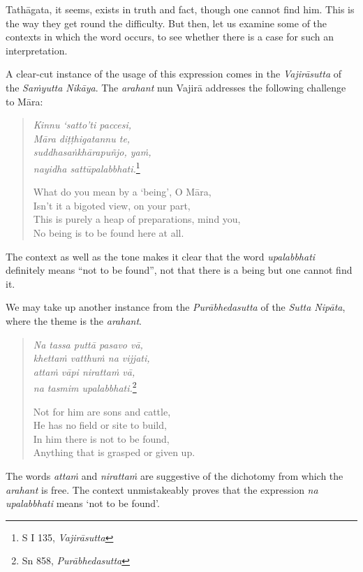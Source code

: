 Tathāgata, it seems, exists in truth and fact, though one cannot find him. This is the way they get round the difficulty. But then, let us examine some of the contexts in which the word occurs, to see whether there is a case for such an interpretation.

A clear-cut instance of the usage of this expression comes in the \emph{Vajirāsutta} of the \emph{Saṁyutta Nikāya}. The \emph{arahant} nun Vajirā addresses the following challenge to Māra:

\clearpage

\begin{quote}
\emph{Kinnu `satto'ti paccesi,}\\
\emph{Māra diṭṭhigatannu te,}\\
\emph{suddhasaṅkhārapuñjo, yaṁ,}\\
\emph{nayidha sattūpalabbhati.}\footnote{S I 135, \emph{Vajirāsutta}}

What do you mean by a `being', O Māra,\\
Isn't it a bigoted view, on your part,\\
This is purely a heap of preparations, mind you,\\
No being is to be found here at all.
\end{quote}

The context as well as the tone makes it clear that the word \emph{upalabbhati} definitely means ``not to be found'', not that there is a being but one cannot find it.

We may take up another instance from the \emph{Purābhedasutta} of the \emph{Sutta Nipāta}, where the theme is the \emph{arahant}.

\begin{quote}
\emph{Na tassa puttā pasavo vā,}\\
\emph{khettaṁ vatthuṁ na vijjati,}\\
\emph{attaṁ vāpi nirattaṁ vā,}\\
\emph{na tasmim upalabbhati.}\footnote{Sn 858, \emph{Purābhedasutta}}

Not for him are sons and cattle,\\
He has no field or site to build,\\
In him there is not to be found,\\
Anything that is grasped or given up.
\end{quote}

The words \emph{attaṁ} and \emph{nirattaṁ} are suggestive of the dichotomy from which the \emph{arahant} is free. The context unmistakeably proves that the expression \emph{na upalabbhati} means `not to be found'.

